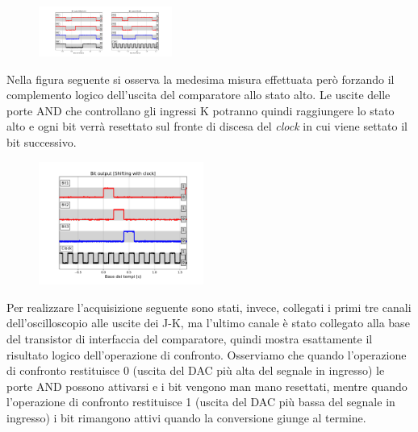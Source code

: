 \documentclass[journal]{IEEEtran}
\begin{document}
\vspace{-10mm}

\begin{figure}[H]%
\begin{center}
\includegraphics[trim = {600 0 100 0}, clip, width=0.39\textwidth]{analysis/output/cumulative_BIT.pdf}
\label{fig:cumulative_BIT_clk}
\end{center}
\end{figure}

\vspace{-7mm}

Nella figura seguente si osserva la medesima misura effettuata però forzando il complemento logico dell'uscita del comparatore allo stato alto. Le uscite delle porte AND che controllano gli ingressi K potranno quindi raggiungere lo stato alto e ogni bit verrà resettato sul fronte di discesa del \textit{clock} in cui viene settato il bit successivo.

\begin{figure}[H]%
\begin{center}
\includegraphics[width=0.48\textwidth]{analysis/output/BIT-shift-clk.pdf}
\label{fig:BIT_shift_clk}
\end{center}
\end{figure}

Per realizzare l'acquisizione seguente sono stati, invece, collegati i primi tre canali dell'oscilloscopio alle uscite dei J-K, ma l'ultimo canale è stato collegato alla base del transistor di interfaccia del comparatore, quindi mostra esattamente il risultato logico dell'operazione di confronto. Osserviamo che quando l'operazione di confronto restituisce 0 (uscita del DAC più alta del segnale in ingresso) le porte AND possono attivarsi e i bit vengono man mano resettati, mentre quando l'operazione di confronto restituisce 1 (uscita del DAC più bassa del segnale in ingresso) i bit rimangono attivi quando la conversione giunge al termine.
\end{document}

